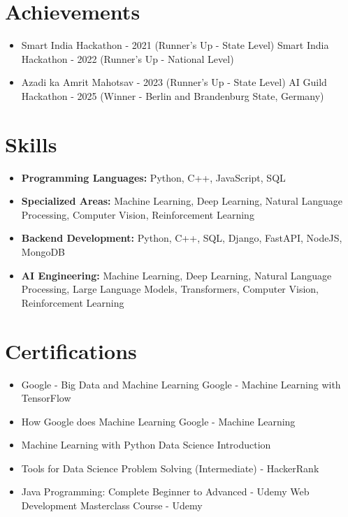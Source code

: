 \documentclass[a4paper,10pt]{article}
\begin{document}
\section*{Achievements}
\begin{itemize}
\item Smart India Hackathon - 2021 (Runner's Up - State Level) \hfill Smart India Hackathon - 2022 (Runner's Up - National Level)
\item Azadi ka Amrit Mahotsav - 2023 (Runner's Up - State Level) \hfill AI Guild Hackathon - 2025 (Winner - Berlin and Brandenburg State, Germany)
\end{itemize}

\section*{Skills}
\begin{itemize}
  \item \textbf{Programming Languages:} Python, C++, JavaScript, SQL
  \item \textbf{Specialized Areas:} Machine Learning, Deep Learning, Natural Language Processing, Computer Vision, Reinforcement Learning
  \item \textbf{Backend Development:} Python, C++, SQL, Django, FastAPI, NodeJS, MongoDB
  \item \textbf{AI Engineering:} Machine Learning, Deep Learning, Natural Language Processing, Large Language Models, Transformers, Computer Vision, Reinforcement Learning
\end{itemize}

\section*{Certifications}
\begin{itemize}
\item Google - Big Data and Machine Learning \hfill Google - Machine Learning with TensorFlow
\item How Google does Machine Learning \hfill Google - Machine Learning
\item Machine Learning with Python \hfill Data Science Introduction
\item Tools for Data Science \hfill Problem Solving (Intermediate) - HackerRank
\item Java Programming: Complete Beginner to Advanced - Udemy \hfill Web Development Masterclass Course - Udemy
\end{itemize}
\end{document}
